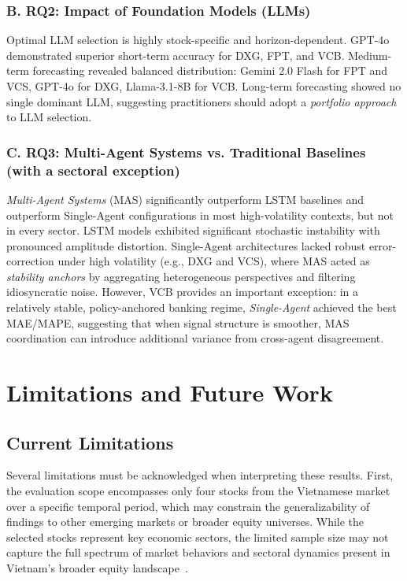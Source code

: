 \documentclass{ieeeaccess}
\begin{document}
\subsubsection{B. RQ2: Impact of Foundation Models (LLMs)}
Optimal LLM selection is highly stock-specific and horizon-dependent. GPT-4o demonstrated superior short-term accuracy for DXG, FPT, and VCB. Medium-term forecasting revealed balanced distribution: Gemini 2.0 Flash for FPT and VCS, GPT-4o for DXG, Llama-3.1-8B for VCB. Long-term forecasting showed no single dominant LLM, suggesting practitioners should adopt a \textit{portfolio approach} to LLM selection.

\subsubsection{C. RQ3: Multi-Agent Systems vs. Traditional Baselines (with a sectoral exception)}
\textit{Multi-Agent Systems} (MAS) significantly outperform LSTM baselines and outperform Single-Agent configurations in most high-volatility contexts, but not in every sector. LSTM models exhibited significant stochastic instability with pronounced amplitude distortion. Single-Agent architectures lacked robust error-correction under high volatility (e.g., DXG and VCS), where MAS acted as \textit{stability anchors} by aggregating heterogeneous perspectives and filtering idiosyncratic noise. However, VCB provides an important exception: in a relatively stable, policy-anchored banking regime, \textit{Single-Agent} achieved the best MAE/MAPE, suggesting that when signal structure is smoother, MAS coordination can introduce additional variance from cross-agent disagreement.





\section{Limitations and Future Work}
\subsection{Current Limitations}
Several limitations must be acknowledged when interpreting these results. First, the evaluation scope encompasses only four stocks from the Vietnamese market over a specific temporal period, which may constrain the generalizability of findings to other emerging markets or broader equity universes. While the selected stocks represent key economic sectors, the limited sample size may not capture the full spectrum of market behaviors and sectoral dynamics present in Vietnam's broader equity landscape~\cite{phan2015stock}.
\end{document}
